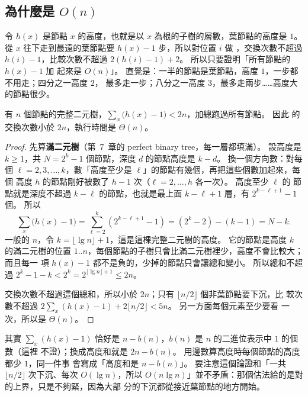 \subsection{為什麼是 $O(n)$}

令 $h(x)$ 是節點 $x$ 的高度，也就是以 $x$ 為根的子樹的層數，葉節點的高度是 $1$。 從 $x$
往下走到最遠的葉節點要 $h(x) - 1$ 步，所以對位置 $i$ 做 ，交換次數不超過
$h(i) - 1$，比較次數不超過 $2(h(i) - 1) + 2$。 所以只要證明「所有節點的 $h(x) - 1$ 加
起來是 $O(n)$」。 直覺是：一半的節點是葉節點，高度 $1$，一步都不用走；四分之一高度 $2$，
最多走一步；八分之一高度 $3$，最多走兩步……高度大的節點很少。

\begin{theorem}
\label{thm:hp-build}
有 $n$ 個節點的完整二元樹，$\sum_x \bigl(h(x) - 1\bigr) < 2n$，加總跑過所有節點。 因此
 的交換次數小於 $2n$，執行時間是 $\Theta(n)$。
\end{theorem}

\begin{proof}
先算\textbf{滿二元樹}（第~7~章的 perfect binary tree，每一層都填滿）。 設高度是
$k \ge 1$，共 $N = 2^k - 1$ 個節點，深度 $d$ 的節點高度是 $k - d$。 換一個方向數：對每個
$\ell = 2, 3, \ldots, k$，數「高度至少是 $\ell$」的節點有幾個，再把這些個數加起來，每個
高度 $h$ 的節點剛好被數了 $h - 1$ 次（$\ell = 2, \ldots, h$ 各一次）。 高度至少 $\ell$ 的
節點就是深度不超過 $k - \ell$ 的節點，也就是最上面 $k - \ell + 1$ 層，有
$2^{k - \ell + 1} - 1$ 個。 所以
\[
\sum_{x} \bigl(h(x) - 1\bigr)
= \sum_{\ell=2}^{k} \left(2^{k - \ell + 1} - 1\right)
= (2^k - 2) - (k - 1)
= N - k.
\]
一般的 $n$，令 $k = \lfloor \lg n \rfloor + 1$，這是這棵完整二元樹的高度。 它的節點是高度
$k$ 的滿二元樹的位置 $1..n$，每個節點的子樹只會比滿二元樹裡少，高度不會比較大；而且每一
項 $h(x) - 1$ 都不是負的，少掉的節點只會讓總和變小。 所以總和不超過
$2^k - 1 - k < 2^k = 2^{\lfloor \lg n \rfloor + 1} \le 2n$。

交換次數不超過這個總和，所以小於 $2n$；只有 $\lfloor n/2 \rfloor$ 個非葉節點要下沉，比
較次數不超過 $2\sum_x (h(x) - 1) + 2\lfloor n/2 \rfloor < 5n$。 另一方面每個元素至少要看
一次，所以是 $\Theta(n)$。
\end{proof}

其實 $\sum_x (h(x) - 1)$ 恰好是 $n - b(n)$，$b(n)$ 是 $n$ 的二進位表示中 $1$ 的個數（這裡
不證）；換成高度和就是 $2n - b(n)$。 用邊數算高度時每個節點的高度都少 $1$，同一件事
會寫成「高度和是 $n - b(n)$」。 要注意這個論證和「一共 $\lfloor n/2 \rfloor$ 次下沉、每次
$O(\lg n)$，所以 $O(n \lg n)$」並不矛盾：那個估法給的是對的上界，只是不夠緊，因為大部
分的下沉都從接近葉節點的地方開始。


